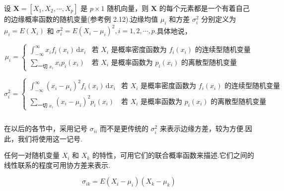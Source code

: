 设 $\bm{X}=[X_1,X_2,\cdots,X_p]$ 是 $p\times1$ 随机向量，则 $\bm{X}$ 的每个元素都是一个有着自己的边缘概率函数的随机变量(参考例 2.12).边缘均值 $\mu_i$ 和方差 $\sigma_i^2$ 分别定义为 $\mu_i=E(X_i)$ 和 $\sigma_i^2=E(X_i-\mu_i)^2,i=1,2,\cdots,p$.具体地说，

\[
\mu_i=
\begin{cases}
\displaystyle\int_{-\infty}^{\infty}x_if_i(x_i)\,\mathrm{d}x_i & \text{若 } X_i \text{ 是概率密度函数为 } f_i(x_i) \text{ 的连续型随机变量}\\[2ex]
\displaystyle\sum_{\text{一切 }x_i}x_ip_i(x_i) & \text{若 } X_i \text{ 是概率函数为 } p_i(x_i) \text{ 的离散型随机变量}
\end{cases}
\]

\[
\sigma_i^2=
\begin{cases}
\displaystyle\int_{-\infty}^{\infty}(x_i-\mu_i)^2f_i(x_i)\,\mathrm{d}x_i & \text{若 } X_i \text{ 是概率密度函数为 } f_i(x_i) \text{ 的连续型随机变量}\\[2ex]
\displaystyle\sum_{\text{一切 }x_i}(x_i-\mu_i)^2p_i(x_i) & \text{若 } X_i \text{ 是概率函数为 } p_i(x_i) \text{ 的离散型随机变量}
\end{cases}
\]

\label{eq:2-25}
\begin{equation}
\tag{2-25}
\end{equation}

在以后的各节中，采用记号 $\sigma_{ii}$ 而不是更传统的 $\sigma_i^2$ 来表示边缘方差，较为方便.因此，我们将使用这一记号.

任何一对随机变量 $X_i$ 和 $X_k$ 的特性，可用它们的联合概率函数来描述.它们之间的线性联系的程度可用协方差来表示.

\[
\sigma_{ik}=E(X_i-\mu_i)(X_k-\mu_k)
\]
